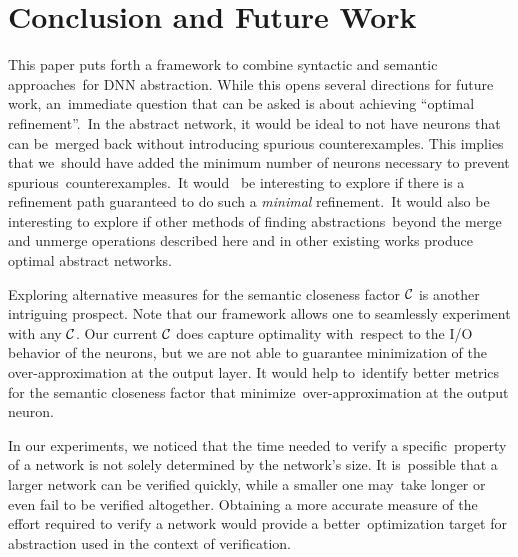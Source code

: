 \section{Conclusion and Future Work}


This paper puts forth a framework to combine syntactic and semantic approaches for DNN abstraction. While this opens several directions for future work, an immediate question that can be asked is about achieving ``optimal refinement''. In the abstract network, it would be ideal to not have neurons that can be merged back without introducing spurious counterexamples. This implies that we should have added the minimum number of neurons necessary to prevent spurious counterexamples. It would  be interesting to explore if there is a refinement path guaranteed to do such a \emph{minimal} refinement. It would also be interesting to explore if other methods of finding abstractions beyond the merge and unmerge operations described here and in other existing works \cite{cegar-nn,cegarette,cleverest-nn,deep-abstract} produce optimal abstract networks. 

Exploring alternative measures for the semantic closeness factor $\mathcal{C}$ is another intriguing prospect. Note that our framework allows one to seamlessly experiment with any $\mathcal{C}$. Our current $\mathcal{C}$ does capture optimality with respect to the I/O behavior of the neurons, but we are not able to guarantee
minimization of the over-approximation at the output layer. It would help to identify better metrics for the semantic closeness factor that minimize over-approximation at the output neuron.

In our experiments, we noticed that the time needed to verify a specific property of a network is not solely determined by the network's size. It is possible that a larger network can be verified quickly, while a smaller one may take longer or even fail to be verified altogether. Obtaining a more accurate
measure of the effort required to verify a network would provide a better optimization target for abstraction used in the context of verification.




